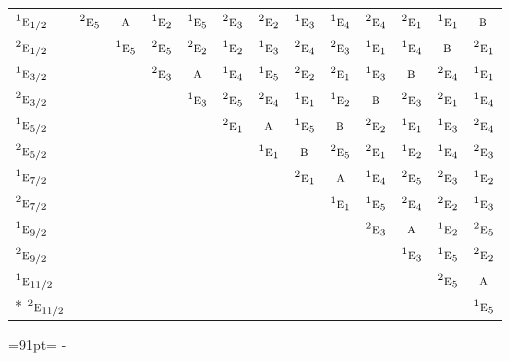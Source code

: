 \documentclass[10pt,a4paper]{article}
\newcommand{\needspace}[1]{\par\penalty-100\begingroup\dimen0=#1\relax\dimen2=\pagegoal
  \advance\dimen2-\pagetotal\ifdim\dimen0>\dimen2\relax\ifdim\dimen2>0pt\vfil\break\fi\fi
  \endgroup}
\numberwithin{equation}{section}
\newcommand{\irr}[1]{\text{\normalfont\scshape #1}}
\newcommand{\conjpair}[1]{{}^{#1}}
\begin{document}
{\begin{longtable}{@{}lcccccccccccc@{}}
$\conjpair{1}\irr{e}_{1/2}$ & $\conjpair{2}\irr{e}_{5}$ & $\irr{a}$ & $\conjpair{1}\irr{e}_{2}$ & $\conjpair{1}\irr{e}_{5}$ & $\conjpair{2}\irr{e}_{3}$ & $\conjpair{2}\irr{e}_{2}$ & $\conjpair{1}\irr{e}_{3}$ & $\conjpair{1}\irr{e}_{4}$ & $\conjpair{2}\irr{e}_{4}$ & $\conjpair{2}\irr{e}_{1}$ & $\conjpair{1}\irr{e}_{1}$ & $\irr{b}$\\
$\conjpair{2}\irr{e}_{1/2}$ &  & $\conjpair{1}\irr{e}_{5}$ & $\conjpair{2}\irr{e}_{5}$ & $\conjpair{2}\irr{e}_{2}$ & $\conjpair{1}\irr{e}_{2}$ & $\conjpair{1}\irr{e}_{3}$ & $\conjpair{2}\irr{e}_{4}$ & $\conjpair{2}\irr{e}_{3}$ & $\conjpair{1}\irr{e}_{1}$ & $\conjpair{1}\irr{e}_{4}$ & $\irr{b}$ & $\conjpair{2}\irr{e}_{1}$\\
$\conjpair{1}\irr{e}_{3/2}$ &  &  & $\conjpair{2}\irr{e}_{3}$ & $\irr{a}$ & $\conjpair{1}\irr{e}_{4}$ & $\conjpair{1}\irr{e}_{5}$ & $\conjpair{2}\irr{e}_{2}$ & $\conjpair{2}\irr{e}_{1}$ & $\conjpair{1}\irr{e}_{3}$ & $\irr{b}$ & $\conjpair{2}\irr{e}_{4}$ & $\conjpair{1}\irr{e}_{1}$\\
$\conjpair{2}\irr{e}_{3/2}$ &  &  &  & $\conjpair{1}\irr{e}_{3}$ & $\conjpair{2}\irr{e}_{5}$ & $\conjpair{2}\irr{e}_{4}$ & $\conjpair{1}\irr{e}_{1}$ & $\conjpair{1}\irr{e}_{2}$ & $\irr{b}$ & $\conjpair{2}\irr{e}_{3}$ & $\conjpair{2}\irr{e}_{1}$ & $\conjpair{1}\irr{e}_{4}$\\
$\conjpair{1}\irr{e}_{5/2}$ &  &  &  &  & $\conjpair{2}\irr{e}_{1}$ & $\irr{a}$ & $\conjpair{1}\irr{e}_{5}$ & $\irr{b}$ & $\conjpair{2}\irr{e}_{2}$ & $\conjpair{1}\irr{e}_{1}$ & $\conjpair{1}\irr{e}_{3}$ & $\conjpair{2}\irr{e}_{4}$\\
$\conjpair{2}\irr{e}_{5/2}$ &  &  &  &  &  & $\conjpair{1}\irr{e}_{1}$ & $\irr{b}$ & $\conjpair{2}\irr{e}_{5}$ & $\conjpair{2}\irr{e}_{1}$ & $\conjpair{1}\irr{e}_{2}$ & $\conjpair{1}\irr{e}_{4}$ & $\conjpair{2}\irr{e}_{3}$\\
$\conjpair{1}\irr{e}_{7/2}$ &  &  &  &  &  &  & $\conjpair{2}\irr{e}_{1}$ & $\irr{a}$ & $\conjpair{1}\irr{e}_{4}$ & $\conjpair{2}\irr{e}_{5}$ & $\conjpair{2}\irr{e}_{3}$ & $\conjpair{1}\irr{e}_{2}$\\
$\conjpair{2}\irr{e}_{7/2}$ &  &  &  &  &  &  &  & $\conjpair{1}\irr{e}_{1}$ & $\conjpair{1}\irr{e}_{5}$ & $\conjpair{2}\irr{e}_{4}$ & $\conjpair{2}\irr{e}_{2}$ & $\conjpair{1}\irr{e}_{3}$\\
$\conjpair{1}\irr{e}_{9/2}$ &  &  &  &  &  &  &  &  & $\conjpair{2}\irr{e}_{3}$ & $\irr{a}$ & $\conjpair{1}\irr{e}_{2}$ & $\conjpair{2}\irr{e}_{5}$\\
$\conjpair{2}\irr{e}_{9/2}$ &  &  &  &  &  &  &  &  &  & $\conjpair{1}\irr{e}_{3}$ & $\conjpair{1}\irr{e}_{5}$ & $\conjpair{2}\irr{e}_{2}$\\
$\conjpair{1}\irr{e}_{11/2}$ &  &  &  &  &  &  &  &  &  &  & $\conjpair{2}\irr{e}_{5}$ & $\irr{a}$\\*
$\conjpair{2}\irr{e}_{11/2}$ &  &  &  &  &  &  &  &  &  &  &  & $\conjpair{1}\irr{e}_{5}$\\
\bottomrule\end{longtable}}
\needspace{91pt}
\end{document}

